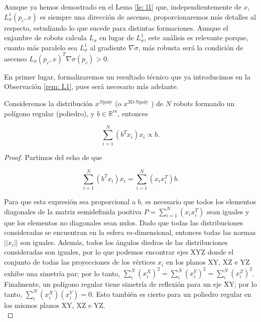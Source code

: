 Aunque ya hemos demostrado en el Lema \ref{le: l1} que, independientemente de $x$, $L^1_\sigma(p_c, x)$ es siempre una dirección de ascenso, proporcionaremos más detalles al respecto, estudiando lo que sucede para distintas formaciones. Aunque el enjambre de robots calcula $L_\sigma$ en lugar de $L^1_\sigma$, este análisis es relevante porque, cuanto más paralelo sea $L^1_\sigma$ al gradiente $\nabla\sigma$, más robusta será la condición de ascenso $L_\sigma(p_c, x)^T\nabla\sigma(p_c) > 0$. 

En primer lugar, formalizaremos un resultado técnico que ya introducimos en la Observación \ref{rem: L1}, pues será necesario más adelante.

\begin{lemma} \label{le: 4}
Consideremos la distribución $x^{N\text{poly}}$ (o $x^{\text{3D-Npoly}}$ ) de $N$ robots formando un polígono regular (poliedro), y $b\in\mathbb{R}^m$, entonces

\begin{equation}
\sum_{i=1}^N \left(b^Tx_i\right)x_i \propto b. \nonumber
\end{equation}

\end{lemma}

\begin{proof}
Partimos del echo de que

\begin{equation}
\sum_{i=1}^N \left(b^T x_i\right)x_i = \sum_{i=1}^N(x_ix_i^T)b. \nonumber
\end{equation}

Para que esta expresión sea proporcional a $b$, es necesario que todos los elementos diagonales de la matriz semidefinida positiva $P = \sum_{i=1}^N(x_ix_i^T)$ sean iguales y que los elementos no diagonales sean nulos. Dado que todas las distribuciones consideradas se encuentran en la esfera $m$-dimensional, entonces todas las normas $||x_i||$ son iguales. Además, todos los ángulos diedros de las distribuciones consideradas son iguales, por lo que podemos encontrar ejes XYZ donde el conjunto de todas las proyecciones de los vértices $x_i$ en los planos XY, XZ e YZ exhibe una simetría par; por lo tanto, $\sum_i^N (x_i^X)^2 = \sum_i^N (x_i^Y)^2 = \sum_i^N (x_i^Z)^2$. Finalmente, un polígono regular tiene simetría de reflexión para un eje XY; por lo tanto, $\sum_i^N (x_i^X)(x_i^Y) = 0$. Esto también es cierto para un poliedro regular en los mismos planos XY, XZ e YZ.\\
\end{proof}


